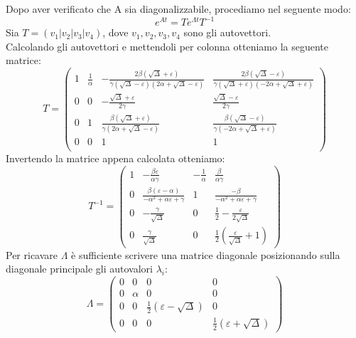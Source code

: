 Dopo aver verificato che A sia diagonalizzabile, procediamo nel seguente modo:
\begin{displaymath}
e^{At}=Te^{\Lambda t}T^{-1}
\end{displaymath}
Sia $T=(v_1|v_2|v_3|v_4)$, dove $v_1,v_2,v_3,v_4$ sono gli autovettori. \\
Calcolando gli autovettori e mettendoli per colonna otteniamo la seguente matrice:
\begin{displaymath}
T=\left(\begin{array}{cccc}
1 & \frac{1}{\alpha} & -\frac{2\beta(\sqrt{\Delta}+\varepsilon)}{\gamma(\sqrt{\Delta}-\varepsilon)(2\alpha+\sqrt{\Delta}-\varepsilon)} & \frac{2\beta(\sqrt{\Delta}-\varepsilon)}{\gamma(\sqrt{\Delta}+\varepsilon)(-2\alpha+\sqrt{\Delta}+\varepsilon)}\\
0 & 0 & -\frac{\sqrt{\Delta}+\varepsilon}{2\gamma} & \frac{\sqrt{\Delta}-\varepsilon}{2\gamma} \\
0 & 1 & \frac{\beta(\sqrt{\Delta}+\varepsilon)}{\gamma(2\alpha+\sqrt{\Delta}-\varepsilon)}  & \frac{\beta(\sqrt{\Delta}-\varepsilon)}{\gamma(-2\alpha+\sqrt{\Delta}+\varepsilon)}\\
0 & 0 & 1 & 1\\
\end{array}\right)
\end{displaymath}
Invertendo la matrice appena calcolata otteniamo:
\begin{displaymath}
T^{-1}=\left(\begin{array}{cccc}
1 & -\frac{\beta\varepsilon}{\alpha\gamma} & -\frac{1}{\alpha} & \frac{\beta}{\alpha\gamma}\\
0 & \frac{\beta(\varepsilon-\alpha)}{-\alpha^{2}+\alpha\varepsilon+\gamma} & 1 & \frac{-\beta}{-\alpha^{2}+\alpha\varepsilon+\gamma}\\
0 & -\frac{\gamma}{\sqrt{\Delta}} & 0 & \frac{1}{2}-\frac{\varepsilon}{2\sqrt{\Delta}}\\
0 & \frac{\gamma}{\sqrt{\Delta}} & 0 & \frac{1}{2}(\frac{\varepsilon}{\sqrt{\Delta}}+1)
\end{array}\right)
\end{displaymath}
Per ricavare $\Lambda$ è sufficiente scrivere una matrice diagonale posizionando sulla diagonale principale gli autovalori $\lambda_i$:
\begin{displaymath}
\Lambda=\left(\begin{array}{cccc}
0 & 0 & 0 & 0\\
0 & \alpha & 0 & 0\\
0 & 0 & \frac{1}{2}(\varepsilon-\sqrt{\Delta}) & 0\\
0 & 0 & 0 & \frac{1}{2}(\varepsilon+\sqrt{\Delta})
\end{array}\right)
\end{displaymath}
